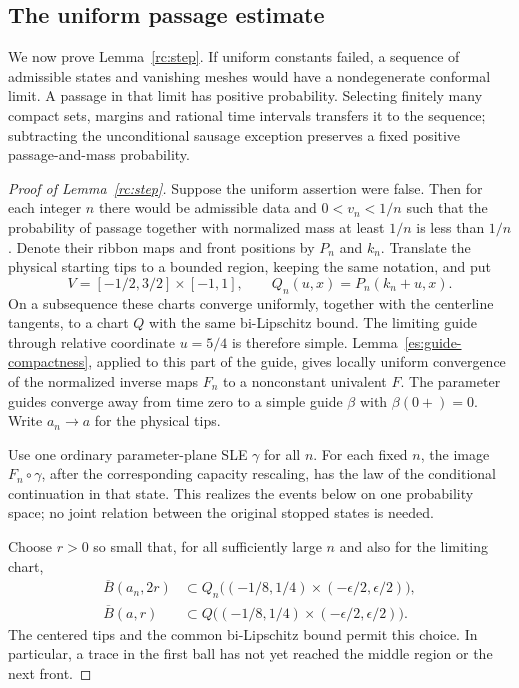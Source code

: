 \subsection{The uniform passage estimate}

We now prove Lemma~\ref{rc:step}. If uniform constants failed,
a sequence of admissible states and vanishing meshes would have a
nondegenerate conformal limit. A passage in that limit has positive
probability. Selecting finitely many compact sets, margins and
rational time intervals transfers it to the sequence; subtracting
the unconditional sausage exception preserves a fixed positive
passage-and-mass probability.




\begin{proof}[Proof of Lemma~\ref{rc:step}]
Suppose the uniform assertion were false.  Then for each integer $n$
there would be admissible data and $0<v_n<1/n$ such that the probability
of passage together with normalized mass at least $1/n$ is less than
$1/n$.  Denote their ribbon maps and front positions by $P_n$ and
$k_n$. Translate the physical starting tips to a bounded region, keeping
the same notation, and put
\[
 V=[-1/2,3/2]\times[-1,1],\qquad Q_n(u,x)=P_n(k_n+u,x).
\]
On a subsequence these charts converge uniformly, together with the
centerline tangents, to a chart $Q$ with the same bi-Lipschitz bound.
The limiting guide through relative coordinate $u=5/4$ is therefore
simple. Lemma~\ref{es:guide-compactness}, applied to this part of the
guide, gives locally uniform convergence of the normalized inverse maps
$F_n$ to a nonconstant univalent $F$. The parameter guides converge away
from time zero to a simple guide $\beta$ with $\beta(0+)=0$. Write
$a_n\to a$ for the physical tips.

Use one ordinary parameter-plane SLE $\gamma$ for all $n$. For each
fixed $n$, the image $F_n\circ\gamma$, after the corresponding capacity
rescaling, has the law of the conditional continuation in that state.
This realizes the events below on one probability space; no joint
relation between the original stopped states is needed.

Choose $r>0$ so small that, for all sufficiently large $n$ and also for
the limiting chart,
\[
 \begin{aligned}
 \overline B(a_n,2r)&\subset
 Q_n\bigl((-1/8,1/4)\times(-\epsilon/2,\epsilon/2)\bigr),\\
 \overline B(a,r)&\subset
 Q\bigl((-1/8,1/4)\times(-\epsilon/2,\epsilon/2)\bigr).
 \end{aligned}
\]
The centered tips and the common bi-Lipschitz bound permit this choice.
In particular, a trace in the first ball has not yet reached the middle
region or the next front.


\end{proof}
